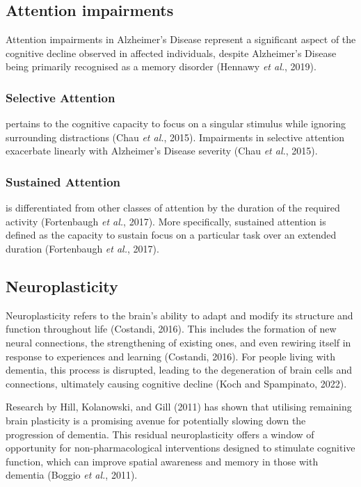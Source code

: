 \documentclass{l4proj}
\begin{document}
\subsection{Attention impairments}\label{sec:attention}
Attention impairments in Alzheimer’s Disease represent a significant aspect of the cognitive decline observed in affected individuals, despite Alzheimer’s Disease being primarily recognised as a memory disorder (Hennawy \emph{et al.}, 2019).

\subsubsection{Selective Attention}
pertains to the cognitive capacity to focus on a singular stimulus while ignoring surrounding distractions (Chau \emph{et al.}, 2015). Impairments in selective attention exacerbate linearly with Alzheimer’s Disease severity (Chau \emph{et al.}, 2015).

\subsubsection{Sustained Attention} is differentiated from other classes of attention by the duration of the required activity (Fortenbaugh \emph{et al.}, 2017). More specifically, sustained attention is defined as the capacity to sustain focus on a particular task over an extended duration (Fortenbaugh \emph{et al.}, 2017).

\subsection{Neuroplasticity}\label{sec:neuroplasticity}
Neuroplasticity refers to the brain's ability to adapt and modify its structure and function throughout life (Costandi, 2016). This includes the formation of new neural connections, the strengthening of existing ones, and even rewiring itself in response to experiences and learning (Costandi, 2016). For people living with dementia, this process is disrupted, leading to the degeneration of brain cells and connections, ultimately causing cognitive decline (Koch and Spampinato, 2022).

Research by Hill, Kolanowski, and Gill (2011) has shown that utilising remaining brain plasticity is a promising avenue for potentially slowing down the progression of dementia. This residual neuroplasticity offers a window of opportunity for non-pharmacological interventions designed to stimulate cognitive function, which can improve spatial awareness and memory in those with dementia (Boggio \emph{et al.}, 2011).
\end{document}
